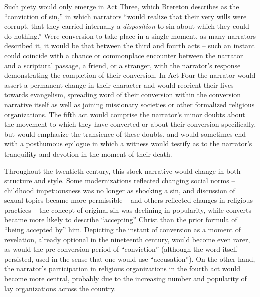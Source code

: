 \documentclass[11pt]{article}
\begin{document}
Such piety would only emerge in Act Three, which Brereton describes as the ``conviction of sin,'' in which narrators ``would realize that their very wills were corrupt, that they carried internally a \textit{disposition} to sin about which they could do nothing.''\autocite[7]{Br91} Were conversion to take place in a single moment, as many narrators described it, it would be that between the third and fourth acts -- such an instant could coincide with a chance or commonplace encounter between the narrator and a scriptural passage, a friend, or a stranger, with the narrator's response demonstrating the completion of their conversion. In Act Four the narrator would assert a permanent change in their character and would reorient their lives towards evangelism, spreading word of their conversion within the conversion narrative itself as well as joining missionary societies or other formalized religious organizations. The fifth act would comprise the narrator's minor doubts about the movement to which they have converted or about their conversion specifically, but would emphasize the transience of these doubts, and would sometimes end with a posthumous epilogue in which a witness would testify as to the narrator's tranquility and devotion in the moment of their death.\autocite[9]{Br91} 

Throughout the twentieth century, this stock narrative would change in both structure and style. Some modernizations reflected changing social norms -- childhood impetuousness was no longer as shocking a sin, and discussion of sexual topics became more permissible -- and others reflected changes in religious practices -- the concept of original sin was declining in popularity, while converts became more likely to describe ``accepting'' Christ than the prior formula of ``being accepted by'' him.\autocite[56]{Br91} Depicting the instant of conversion as a moment of revelation, already optional in the nineteenth century, would become even rarer, as would the pre-conversion period of ``conviction'' (although the word itself persisted, used in the sense that one would use ``accusation'').\autocite[53]{Br91} On the other hand, the narrator's participation in religious organizations in the fourth act would become more central, probably due to the increasing number and popularity of lay organizations across the country.\autocite[57]{Br91} 
\end{document}
